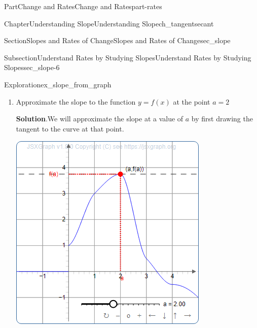 \documentclass{tufte-book}
\newcommand{\blocktitlefont}{\relax}
\numberwithin{equation}{chapter}
\begin{document}
\begin{partptx}{Part}{Change and Rates}{}{Change and Rates}{}{}{part-rates}
\begin{chapterptx}{Chapter}{Understanding Slope}{}{Understanding Slope}{}{}{ch_tangentsecant}
\begin{sectionptx}{Section}{Slopes and Rates of Change}{}{Slopes and Rates of Change}{}{}{sec_slope}
\begin{subsectionptx}{Subsection}{Understand Rates by Studying Slopes}{}{Understand Rates by Studying Slopes}{}{}{sec_slope-6}
\begin{exploration}{Exploration}{}{ex_slope_from_graph}
\begin{enumerate}[font=\bfseries,label=(\alph*),ref=\alph*]
\begin{equation*}
m = \dfrac{3-2}{1-0} = \dfrac{1}{1} = 1
\end{equation*}
Therefore, the slope of \(f(x)\) at \(a=1\) is equal to 1.%
\item{}Approximate the slope to the function \(y=f(x)\) at the point \(a=2\)%
\par\smallskip%
\noindent\textbf{\blocktitlefont Solution}.\hypertarget{ex_slope_from_graph-3-2}{}\quad{}We will approximate the slope at a value of \(a\) by first drawing the tangent to the curve at that point.%
\begin{sidebyside}{2}{0.075}{0.075}{0.17}%
\begin{sbspanel}{0.47}%
\includegraphics[width=\linewidth]{generated/preview/ex_slope_from_graph-3-2-2-preview.png}
\end{sbspanel}%
\begin{sbspanel}{0.21}%

\end{sbspanel}
\end{sidebyside}
\end{enumerate}
\end{exploration}
\end{subsectionptx}
\end{sectionptx}
\end{chapterptx}
\end{partptx}
\end{document}

